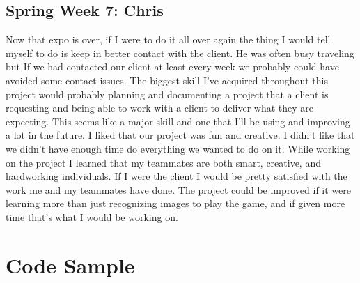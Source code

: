 \documentclass[onecolumn, draftclsnofoot,10pt, compsoc]{IEEEtran}
\begin{document}
\subsection{Spring Week 7: Chris}
Now that expo is over, if I were to do it all over again the thing I would tell myself to do is keep in better contact with the client. He was often busy traveling but If we had contacted our client at least every week we probably could have avoided some contact issues. The biggest skill I've acquired throughout this project would probably planning and documenting a project that a client is requesting and being able to work with a client to deliver what they are expecting. This seems like a major skill and one that I'll be using and improving a lot in the future. I liked that our project was fun and creative. I didn't like that we didn't have enough time do everything we wanted to do on it. While working on the project I learned that my teammates are both smart, creative, and hardworking individuals. If I were the client I would be pretty satisfied with the work me and my teammates have done. The project could be improved if it were learning more than just recognizing images to play the game, and if given more time that's what I would be working on.

\section{Code Sample}
\end{document}
